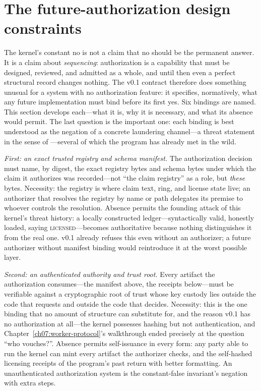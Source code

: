 \section{The future-authorization design constraints}\label{ch09:future}

The kernel's constant no is not a claim that no should be the permanent answer. It is a claim about \emph{sequencing}: authorization is a capability that must be designed, reviewed, and admitted as a whole, and until then even a perfect structural record changes nothing. The v0.1 contract therefore does something unusual for a system with no authorization feature: it specifies, normatively, what any future implementation must bind before its first yes. Six bindings are named. This section develops each---what it is, why it is necessary, and what its absence would permit. The last question is the important one: each binding is best understood as the negation of a concrete laundering channel---a threat statement in the sense of \cite{shostack}---several of which the program has already met in the wild.

\emph{First: an exact trusted registry and schema manifest.} The authorization decision must name, by digest, the exact registry bytes and schema bytes under which the claim it authorizes was recorded---not ``the claim registry'' as a role, but \emph{these} bytes. Necessity: the registry is where claim text, ring, and license state live; an authorizer that resolves the registry by name or path delegates its premise to whoever controls the resolution. Absence permits the founding attack of this kernel's threat history: a locally constructed ledger---syntactically valid, honestly loaded, saying \textsc{licensed}---becomes authoritative because nothing distinguishes it from the real one. v0.1 already refuses this even without an authorizer; a future authorizer without manifest binding would reintroduce it at the worst possible layer.

\emph{Second: an authenticated authority and trust root.} Every artifact the authorization consumes---the manifest above, the receipts below---must be verifiable against a cryptographic root of trust whose key custody lies outside the code that requests and outside the code that decides. Necessity: this is the one binding that no amount of structure can substitute for, and the reason v0.1 has no authorization at all---the kernel possesses hashing but not authentication, and Chapter~\ref{ch07:worker-protocol}'s walkthrough ended precisely at the question ``who vouches?''. Absence permits self-issuance in every form: any party able to run the kernel can mint every artifact the authorizer checks, and the self-hashed licensing receipts of the program's past return with better formatting. An unauthenticated authorization system is the constant-false invariant's negation with extra steps.

